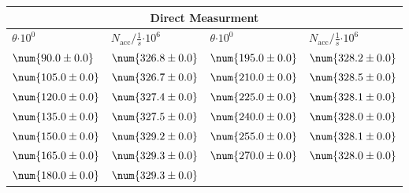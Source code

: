 \begin{tabular}{|p{}|p{}||p{}|p{}|}
\hline
\multicolumn{4}{|c|}{Direct Measurment}\\
\hline
$\theta$$\cdot 10^{0}$&$N_\text{acc}/\frac{1}{s}$$\cdot 10^{6}$&$\theta$$\cdot 10^{0}$&$N_\text{acc}/\frac{1}{s}$$\cdot 10^{6}$\\
\hline
$\num{90.0\pm 0.0}$&$\num{326.8\pm 0.0}$&$\num{195.0\pm 0.0}$&$\num{328.2\pm 0.0}$\\
$\num{105.0\pm 0.0}$&$\num{326.7\pm 0.0}$&$\num{210.0\pm 0.0}$&$\num{328.5\pm 0.0}$\\
$\num{120.0\pm 0.0}$&$\num{327.4\pm 0.0}$&$\num{225.0\pm 0.0}$&$\num{328.1\pm 0.0}$\\
$\num{135.0\pm 0.0}$&$\num{327.5\pm 0.0}$&$\num{240.0\pm 0.0}$&$\num{328.0\pm 0.0}$\\
$\num{150.0\pm 0.0}$&$\num{329.2\pm 0.0}$&$\num{255.0\pm 0.0}$&$\num{328.1\pm 0.0}$\\
$\num{165.0\pm 0.0}$&$\num{329.3\pm 0.0}$&$\num{270.0\pm 0.0}$&$\num{328.0\pm 0.0}$\\
$\num{180.0\pm 0.0}$&$\num{329.3\pm 0.0}$&&\\
\hline
\end{tabular}